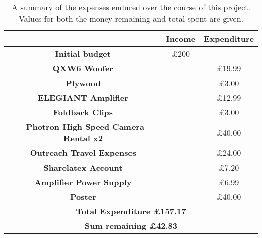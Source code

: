 \begin{table}[hb]
\centering
\begin{tabular}{|c|c|c|}
\hline
\textbf{ }&\textbf{Income}& \textbf{Expenditure}\\
\hline
\textbf{Initial budget}& \pounds200&  \\
\textbf{QXW6 Woofer}& &\pounds19.99  \\
\textbf{Plywood}& &\pounds3.00  \\
\textbf{ ELEGIANT Amplifier}& &\pounds12.99  \\
\textbf{Foldback Clips}& &\pounds3.00  \\
\
\textbf{Photron High Speed Camera Rental x2}& &\pounds40.00  \\
\textbf{Outreach Travel Expenses}& &\pounds24.00  \\
\textbf{Sharelatex Account}& &\pounds7.20  \\

\textbf{Amplifier Power Supply}& &\pounds6.99  \\

\textbf{Poster}& &\pounds 40.00  \\
\hline
\multicolumn{3}{|c|}{\textbf{Total Expenditure \pounds157.17}}\\
\hline
\multicolumn{3}{|c|}{\textbf{Sum remaining \pounds42.83}}\\
\hline
\end{tabular}
\caption{A summary of the expenses endured over the course of this project. Values for both the money remaining and total spent are given.}
\label{table:budget}
\end{table}
\\

